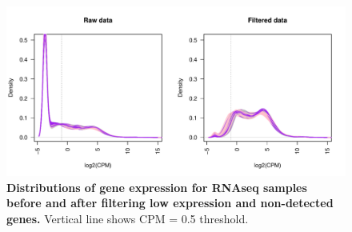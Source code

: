 \begin{figure}
    \includegraphics[width=1.0\textwidth]{mainmatter/figures/chapter_02/rnaseq_data_setup.sample_cpm_density_filtered.pdf}
    \caption{
        \textbf{Distributions of gene expression for \gls{RNAseq} samples before and after filtering low expression and non-detected genes.}
        Vertical line shows \gls{CPM} = 0.5 threshold.
    }
    \label{fig:hird_rnaseq_cpm_filtering}
\end{figure}

